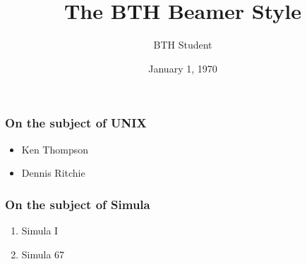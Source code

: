 \documentclass{beamer}
\title{The BTH Beamer Style}
\author{BTH Student}
\date{January 1, 1970}
\begin{document}
\maketitle

\begin{frame}
\frametitle{On the subject of UNIX}

\begin{itemize}
\item Ken Thompson
\item Dennis Ritchie
\end{itemize}

\end{frame}

\begin{frame}
\frametitle{On the subject of Simula}

\begin{enumerate}
\item Simula I
\item Simula 67
\end{enumerate}

\end{frame}
\end{document}
